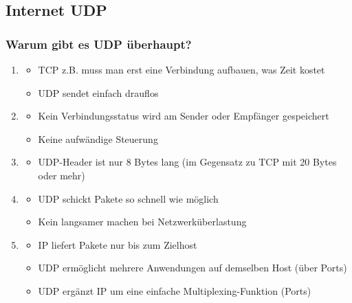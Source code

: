 \subsection{Internet UDP}
\subsubsection*{Warum gibt es UDP überhaupt?}
\begin{enumerate}
    \item {}
    \begin{itemize}
        \item TCP z.B. muss man erst eine Verbindung aufbauen, was Zeit kostet
        \item UDP sendet einfach drauflos
    \end{itemize}
    \item {}
    \begin{itemize}
        \item Kein Verbindungsstatus wird am Sender oder Empfänger gespeichert
        \item Keine aufwändige Steuerung
    \end{itemize}
    \item {}
    \begin{itemize}
        \item UDP-Header ist nur 8 Bytes lang (im Gegensatz zu TCP mit 20 Bytes oder mehr)
    \end{itemize}
    \item {}
    \begin{itemize}
        \item UDP schickt Pakete so schnell wie möglich
        \item Kein langsamer machen bei Netzwerküberlastung
    \end{itemize}
    \item {}
    \begin{itemize}
        \item IP liefert Pakete nur bis zum Zielhost
        \item UDP ermöglicht mehrere Anwendungen auf demselben Host (über Ports)
        \item UDP ergänzt IP um eine einfache Multiplexing-Funktion (Ports)
    \end{itemize}
\end{enumerate}
